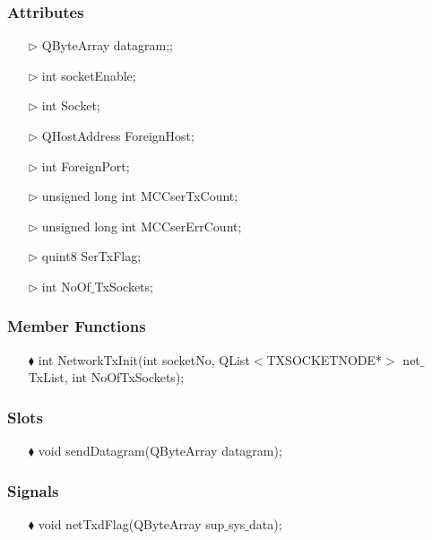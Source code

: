 \begin{enumerate}
\subsubsection{Attributes}
\begin{enumerate}
	\item [$\rhd$] QByteArray datagram;;
	\item [$\rhd$] int socketEnable;
	\item [$\rhd$] int Socket;
	
	\item [$\rhd$] QHostAddress ForeignHost;
	
	
	\item [$\rhd$] int ForeignPort;
	
	\item [$\rhd$] unsigned long int MCCserTxCount;
	\item [$\rhd$] unsigned long int MCCserErrCount;
	\item [$\rhd$] quint8 SerTxFlag;
	\item [$\rhd$] int NoOf$\_$TxSockets;
	
	
\end{enumerate}
\subsubsection{Member Functions }
\begin{enumerate}
	\item [$\blacklozenge$] int NetworkTxInit(int socketNo, QList$<$TXSOCKETNODE*$>$ net$\_$TxList, int NoOfTxSockets);
\end{enumerate}

\subsubsection{Slots}
\begin{enumerate}
	\item [$\blacklozenge$] void sendDatagram(QByteArray datagram);
\end{enumerate}
\subsubsection{Signals}
\begin{enumerate}
	\item [$\blacklozenge$] void netTxdFlag(QByteArray sup$\_$sys$\_$data);
\end{enumerate}


\end{enumerate}

